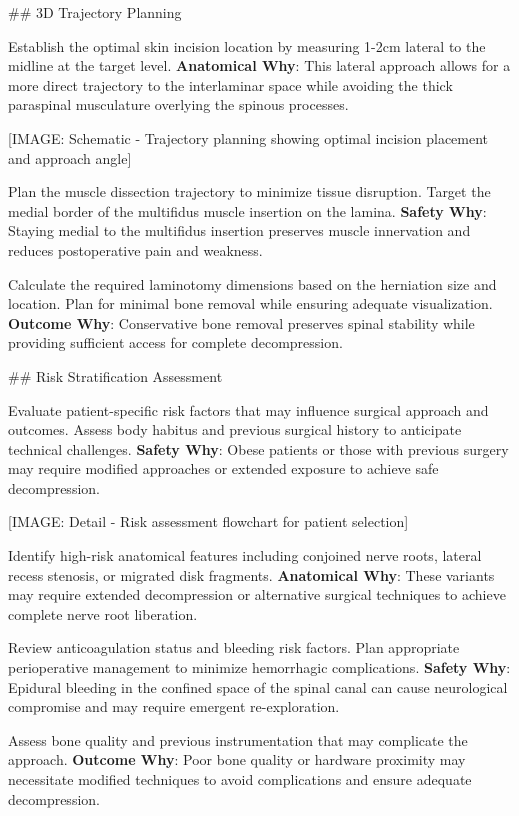 \documentclass[12pt,a4paper]{article}
\begin{document}
\#\# 3D Trajectory Planning

Establish the optimal skin incision location by measuring 1-2cm lateral to the midline at the target level. \textbf{Anatomical Why}: This lateral approach allows for a more direct trajectory to the interlaminar space while avoiding the thick paraspinal musculature overlying the spinous processes.

[IMAGE: Schematic - Trajectory planning showing optimal incision placement and approach angle]

Plan the muscle dissection trajectory to minimize tissue disruption. Target the medial border of the multifidus muscle insertion on the lamina. \textbf{Safety Why}: Staying medial to the multifidus insertion preserves muscle innervation and reduces postoperative pain and weakness.

Calculate the required laminotomy dimensions based on the herniation size and location. Plan for minimal bone removal while ensuring adequate visualization. \textbf{Outcome Why}: Conservative bone removal preserves spinal stability while providing sufficient access for complete decompression.

\#\# Risk Stratification Assessment

Evaluate patient-specific risk factors that may influence surgical approach and outcomes. Assess body habitus and previous surgical history to anticipate technical challenges. \textbf{Safety Why}: Obese patients or those with previous surgery may require modified approaches or extended exposure to achieve safe decompression.

[IMAGE: Detail - Risk assessment flowchart for patient selection]

Identify high-risk anatomical features including conjoined nerve roots, lateral recess stenosis, or migrated disk fragments. \textbf{Anatomical Why}: These variants may require extended decompression or alternative surgical techniques to achieve complete nerve root liberation.

Review anticoagulation status and bleeding risk factors. Plan appropriate perioperative management to minimize hemorrhagic complications. \textbf{Safety Why}: Epidural bleeding in the confined space of the spinal canal can cause neurological compromise and may require emergent re-exploration.

Assess bone quality and previous instrumentation that may complicate the approach. \textbf{Outcome Why}: Poor bone quality or hardware proximity may necessitate modified techniques to avoid complications and ensure adequate decompression.
\end{document}
